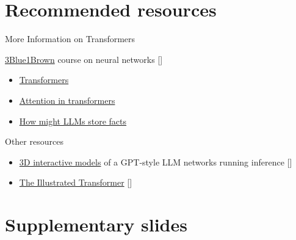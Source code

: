 \documentclass[10pt]{beamer}
\newcommand{\citeme}[1]{{\xspace\color{scAqua} \scriptsize [\cite{#1}]}}
\begin{document}




\appendix

\section{Recommended resources}

\begin{frame}{More Information on Transformers}
	\begin{block}{\href{https://www.youtube.com/playlist?list=PLZHQObOWTQDNU6R1_67000Dx_ZCJB-3pi}{3Blue1Brown} course on neural networks\citeme{Sanderson2024}}
	\begin{itemize}
		\item \href{https://www.youtube.com/watch?v=wjZofJX0v4M&list=PLZHQObOWTQDNU6R1_67000Dx_ZCJB-3pi&index=6}{Transformers}
		\item \href{https://www.youtube.com/watch?v=eMlx5fFNoYc&list=PLZHQObOWTQDNU6R1_67000Dx_ZCJB-3pi&index=7}{Attention in transformers}
		\item \href{https://www.youtube.com/watch?v=9-Jl0dxWQs8&list=PLZHQObOWTQDNU6R1_67000Dx_ZCJB-3pi&index=8}{How might LLMs store facts}
	\end{itemize}
\end{block}
	\begin{block}{Other resources}
	\begin{itemize}
		\item \href{https://bbycroft.net/llm}{3D interactive models} of a GPT-style LLM networks running inference\citeme{Bycroft2023}
		\item \href{http://jalammar.github.io/illustrated-transformer/}{The Illustrated Transformer}\citeme{Alammar2018}
	\end{itemize}
	\end{block}
\end{frame}

\section{Supplementary slides}
\end{document}
